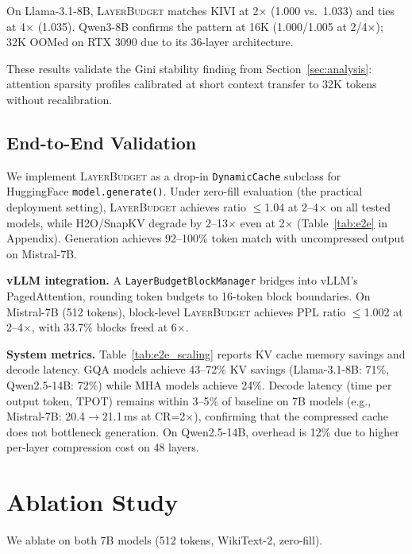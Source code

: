 \documentclass{article}
\newcommand{\layerbudget}{\textsc{LayerBudget}\xspace}
\begin{document}
On Llama-3.1-8B, \layerbudget matches KIVI at 2$\times$ (1.000 vs.\ 1.033) and ties at 4$\times$ (1.035).
Qwen3-8B confirms the pattern at 16K (1.000/1.005 at 2/4$\times$); 32K OOMed on RTX 3090 due to its 36-layer architecture.

These results validate the Gini stability finding from Section~\ref{sec:analysis}: attention sparsity profiles calibrated at short context transfer to 32K tokens without recalibration.

\subsection{End-to-End Validation}
\label{sec:e2e}

We implement \layerbudget as a drop-in \texttt{DynamicCache} subclass for HuggingFace \texttt{model.generate()}.
Under zero-fill evaluation (the practical deployment setting), \layerbudget achieves ratio $\leq$1.04 at 2--4$\times$ on all tested models, while H2O/SnapKV degrade by 2--13$\times$ even at 2$\times$ (Table~\ref{tab:e2e} in Appendix).
Generation achieves 92--100\% token match with uncompressed output on Mistral-7B.

\textbf{vLLM integration.}
A \texttt{LayerBudgetBlockManager} bridges into vLLM's PagedAttention, rounding token budgets to 16-token block boundaries.
On Mistral-7B (512 tokens), block-level \layerbudget achieves PPL ratio $\leq$1.002 at 2--4$\times$, with 33.7\% blocks freed at 6$\times$.

\textbf{System metrics.}
Table~\ref{tab:e2e_scaling} reports KV cache memory savings and decode latency.
GQA models achieve 43--72\% KV savings (Llama-3.1-8B: 71\%, Qwen2.5-14B: 72\%) while MHA models achieve 24\%.
Decode latency (time per output token, TPOT) remains within 3--5\% of baseline on 7B models (e.g., Mistral-7B: 20.4$\to$21.1\,ms at CR=2$\times$), confirming that the compressed cache does not bottleneck generation.
On Qwen2.5-14B, overhead is 12\% due to higher per-layer compression cost on 48 layers.

\section{Ablation Study}
\label{sec:ablation}

We ablate on both 7B models (512 tokens, WikiText-2, zero-fill).
\end{document}
